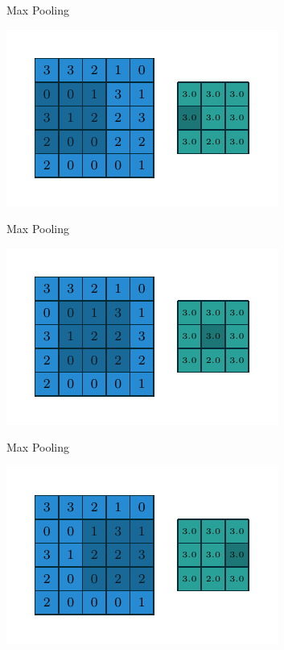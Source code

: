 \documentclass[10pt]{beamer}
\begin{document}
\begin{frame}{Max Pooling}
\begin{center}
\includegraphics[scale=1.5]{images/numerical_max_pooling_03.pdf}
\end{center}
\end{frame}

\begin{frame}{Max Pooling}
\begin{center}
\includegraphics[scale=1.5]{images/numerical_max_pooling_04.pdf}
\end{center}
\end{frame}

\begin{frame}{Max Pooling}
\begin{center}
\includegraphics[scale=1.5]{images/numerical_max_pooling_05.pdf}
\end{center}
\end{frame}
\end{document}
